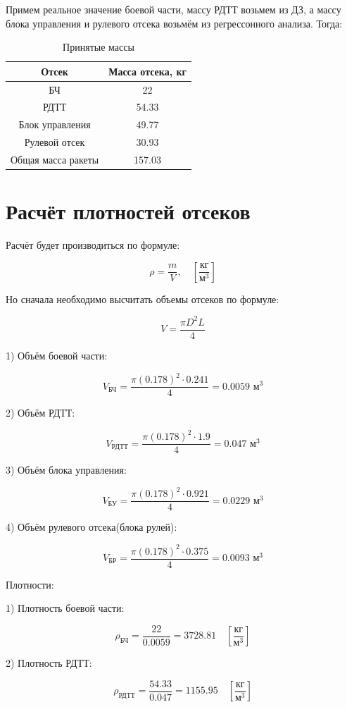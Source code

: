 \documentclass[a4paper,12pt]{report}
\begin{document}
Примем реальное значение боевой части, массу РДТТ  возьмем из ДЗ, а массу блока управления и рулевого отсека возьмём из регрессонного анализа. Тогда:
\begin{table}[H]
\centering
\begin{tabular}{|c|c|}
\hline
\textbf{Отсек} & \textbf{Масса отсека, кг} \\
\hline
БЧ & 22 \\
\hline
РДТТ & 54.33\\
\hline
Блок управления & 49.77\\
\hline
Рулевой отсек & 30.93 \\
\hline
Общая масса ракеты & 157.03 \\
\hline
\end{tabular}
\caption{Принятые массы}
\label{tab:three_columns}
\end{table}

\section{Расчёт плотностей отсеков}

Расчёт будет производиться по формуле:

\[ \rho = \frac{m}{V}, \quad \left[\frac{\text{кг}}{\text{м}^3}\right] \]

Но сначала необходимо высчитать объемы отсеков по формуле: 

\[V = \frac{\pi D^2 L}{4} \]

1) Объём боевой части:

\[V_{\text{БЧ}} = \frac{\pi (0.178)^2 \cdot 0.241}{4} = 0.0059{\text{ м}^3} \]

2) Объём РДТТ:

\[V_{\text{РДТТ}} = \frac{\pi (0.178)^2 \cdot 1.9}{4} = 0.047{\text{ м}^3} \]

3) Объём блока управления:

\[V_{\text{БУ}} = \frac{\pi (0.178)^2 \cdot 0.921}{4} = 0.0229{\text{ м}^3} \]

4) Объём рулевого отсека(блока рулей):

\[V_{\text{БР}} = \frac{\pi (0.178)^2 \cdot 0.375}{4} = 0.0093{\text{ м}^3} \]

Плотности:

1) Плотность боевой части:

\[ \rho_{\text{БЧ}} = \frac{22}{0.0059} = 3728.81 \quad \left[\frac{\text{кг}}{\text{м}^3}\right]\]

2) Плотность РДТТ:

\[ \rho_{\text{РДТТ}} = \frac{54.33}{0.047} = 1155.95 \quad \left[\frac{\text{кг}}{\text{м}^3}\right]\]
\end{document}
